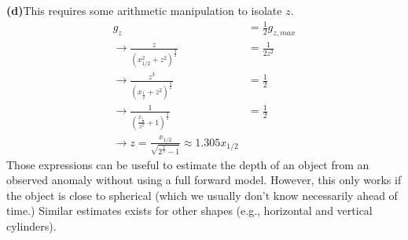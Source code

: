\documentclass[a4paper,12pt]{article}
\begin{document}
\begin{tcolorbox}[enhanced jigsaw,breakable,pad at break*=1mm,
    colback=blue!5!white,colframe=babyblueeyes,title=Solutions]
    \textbf{(d)}This requires some arithmetic manipulation to isolate $z$.
\begin{eqnarray*}
g_z &=\frac{1}{2}g_{z,max} \\
\rightarrow \frac{z}{(x^2_{1/2}+z^2)^\frac{3}{2}} &= \frac{1}{2z^2}\\
\rightarrow \frac{z^3}{(x_{\frac{1}{2}}+z^2)^\frac{3}{2}}&= \frac{1}{2}\\
\rightarrow \frac{1}{(\frac{x_{\frac{1}{2}}}{z^2}+1)^\frac{3}{2}}&= \frac{1}{2}\\
\rightarrow z = \frac{x_{1/2}}{\sqrt{2^{\frac{2}{3}}-1}}\approx 1.305 x_{1/2}
\end{eqnarray*}
Those expressions can be useful to estimate the depth of an object from an observed anomaly without using a full forward model. However, this only works if the object is close to spherical (which we usually don't know necessarily ahead of time.) Similar estimates exists for other shapes (e.g., horizontal and vertical cylinders).
\end{tcolorbox}
\fi
\end{document}

